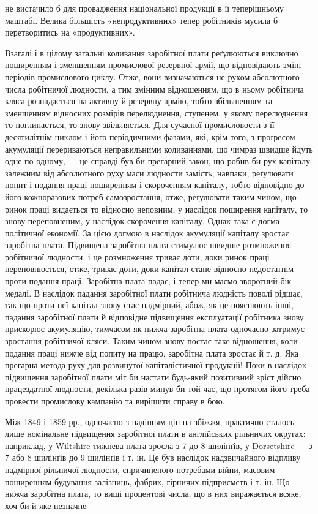 не вистачило б для провадження національної продукції в її
теперішньому маштабі. Велика більшість «непродуктивних»
тепер робітників мусила б перетворитись на «продуктивних».

Взагалі і в цілому загальні коливання заробітної плати реґулюються
виключно поширенням і зменшенням промислової резервної
армії, що відповідають зміні періодів промислового циклу.
Отже, вони визначаються не рухом абсолютного числа робітничої
людности, а тим змінним відношенням, що в ньому робітнича кляса
розпадається на активну й резервну армію, тобто збільшенням
та зменшенням відносних розмірів перелюднення, ступенем, у
якому перелюднення то поглинається, то знову звільняється.
Для сучасної промисловости з її десятилітнім циклом і його періодичними
фазами, які, крім того, з проґресом акумуляції перериваються
неправильними коливаннями, що чимраз швидше йдуть
одне по одному, — це справді був би прегарний закон, що робив
би рух капіталу залежним від абсолютного руху маси людности
замість, навпаки, реґулювати попит і подання праці поширенням
і скороченням капіталу, тобто відповідно до його кожноразових
потреб самозростання, отже, реґулювати таким чином,
що ринок праці видається то відносно неповним, у наслідок
поширення капіталу, то знову переповненим, у наслідок скорочення
капіталу. Однак така є догма політичної економії. За цією
догмою в наслідок акумуляції капіталу зростає заробітна плата.
Підвищена заробітна плата стимулює швидше розмноження робітничої
людности, і це розмноження триває доти, доки ринок
праці переповнюється, отже, триває доти, доки капітал стане
відносно недостатнім проти подання праці. Заробітна плата падає,
і тепер ми маємо зворотний бік медалі. В наслідок падання
заробітної плати робітнича людність поволі рідшає, так що проти
неї капітал знову стає надмірний, абож, як це пояснюють інші,
падання заробітної плати й відповідне підвищення експлуатації
робітника знову прискорює акумуляцію, тимчасом як нижча
заробітна плата одночасно затримує зростання робітничої кляси.
Таким чином знову постає таке відношення, коли подання праці
нижче від попиту на працю, заробітна плата зростає й т. д.
Яка прегарна метода руху для розвинутої капіталістичної продукції!
Поки в наслідок підвищення заробітної плати міг би
настати будь-який позитивний зріст дійсно працездатної людности,
декілька разів минув би той час, що протягом його треба
провести промислову кампанію та вирішити справу в бою.

Між 1849 і 1859 рр., одночасно з падінням цін на збіжжя,
практично сталось лише номінальне підвищення заробітної
плати в англійських рільничих округах: наприклад, у Wiltshire
тижнева плата зросла з 7 до 8 шилінґів, у Dorsetshire — з 7 або
8 шилінґів до 9 шилінґів і т. ін. Це був наслідок надзвичайного
відпливу надмірної рільничої людности, спричиненого потребами
війни, масовим поширенням будування залізниць, фабрик, гірничих
підприємств і т. ін. Що нижча заробітна плата, то вищі процентові
числа, що в них виражається всяке, хоч би й яке незначне
